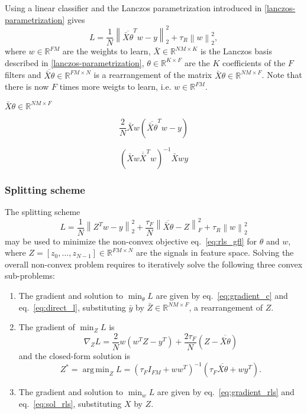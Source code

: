 \documentclass{article}
\DeclareMathOperator*{\argmin}{arg\,min}
\newcommand{\R}{\mathbb{R}}
\newcommand{\norm}[1]{\left\| #1 \right\|}
\begin{document}
Using a linear classifier and the Lanczos parametrization introduced in
\ref{lanczos-parametrization} gives \begin{equation} L =
\frac{1}{N} \norm{\overline{\bar{X} \theta}^T w - y}_2^2 +
\tau_R \norm{w}_2^2, \label{eq:rls_gfl}\end{equation} where
\(w \in \R^{FM}\) are the weights to learn,
\(\bar{X} \in \R^{NM \times K}\) is the Lanczos basis described in
\ref{lanczos-parametrization}, \(\theta \in \R^{K \times F}\) are the
\(K\) coefficients of the \(F\) filters and
\(\overline{\bar{X} \theta} \in \R^{FM \times N}\) is a rearrangement of
the matrix \(\bar{X} \theta \in \R^{NM \times F}\). Note that there is
now \(F\) times more weigts to learn, i.e. \(w \in \R^{FM}\).

\(\bar{X} \theta \in \R^{NM \times F}\)

\[ \frac{2}{N} \bar{X} w (\overline{\bar{X} \theta}^T w - y) \]

\[ (\bar{X} w \overline{\bar{X}}^T w)^{-1} \bar{X}wy \]

\subsubsection{Splitting scheme}\label{splitting-scheme}

The splitting scheme \[ L =
\frac{1}{N} \norm{Z^T w - y}_2^2 +
\frac{\tau_F}{N} \norm{\overline{\bar{X} \theta} - Z}_F^2 +
\tau_R \norm{w}_2^2 \] may be used to minimize the non-convex objective
eq.~\ref{eq:rls_gfl} for \(\theta\) and \(w\), where
\(Z = [z_0, \ldots, z_{N-1}] \in \R^{FM \times N}\) are the signals in
feature space. Solving the overall non-convex problem requires to
iteratively solve the following three convex sub-problems:

\begin{enumerate}
\def\labelenumi{\arabic{enumi}.}
\item
  The gradient and solution to \(\min_\theta L\) are given by
  eq.~\ref{eq:gradient_c} and eq.~\ref{eq:direct_l}, substituting
  \(\bar{y}\) by \(\bar{Z} \in \R^{NM \times F}\), a rearrangement of
  \(Z\).
\item
  The gradient of \(\min_Z L\) is \[ \nabla_Z L =
  \frac{2}{N} w (w^T Z - y^T) + \frac{2\tau_F}{N} (Z - \overline{\bar{X} \theta}) \]
  and the closed-form solution is \[ Z^* = \argmin_Z L =
  \left( \tau_F I_{FM} + w w^T \right)^{-1}
  \left( \tau_F \overline{\bar{X} \theta} + w y^T \right). \]
\item
  The gradient and solution to \(\min_w L\) are given by
  eq.~\ref{eq:gradient_rls} and eq.~\ref{eq:sol_rls}, substituting \(X\)
  by \(Z\).
\end{enumerate}
\end{document}
